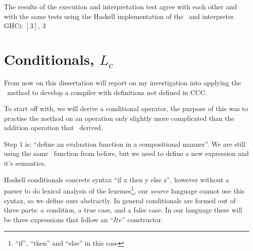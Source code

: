 \documentclass {article}
\begin{document}
The results of the execution and interpretation test
agree with each other and with the same tests
using the Haskell implementation of the \vm\ and interpreter.
GHCi: \( [3],\ 3 \)


%


\section{Conditionals, $L_c$} \label{langcond}

From now on this dissertation will report on my
investigation into applying the \BH\ method to develop a compiler
with definitions not defined in CCC.

To start off with, we will derive a conditional operator,
the purpose of this was to practise the method
on an operation only slightly more complicated than
the addition operation that \BH\ derived.

\newcommand{\ite}{$Ite$}

Step 1 is: 
``define an evaluation function in a compositional manner''.
We are still using the same \eval\ function from before,
but we need to define a new 
expression and it's semantics.

Haskell conditionals concrete
syntax ``if  x then y else z'',
however without a parser to do
lexical analysis\cite[chapter 2.2]{dragon} of the lexemes\footnote{
``if'', ``then'' and ``else'' in this case},
our \emph{source} language cannot use this
syntax, so we define ours abstractly.
In general conditionals are formed out of three parts:
a condition, a true case, and a false case.
In our language these will be three expressions
that follow an ``\ite'' constructor.
\end{document}
